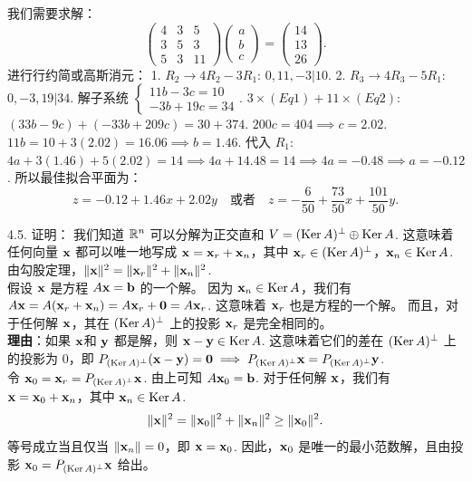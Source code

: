 \begin{exer}
我们需要求解：
$$ \begin{pmatrix} 4 & 3 & 5 \\ 3 & 5 & 3 \\ 5 & 3 & 11 \end{pmatrix} \begin{pmatrix} a \\ b \\ c \end{pmatrix} = \begin{pmatrix} 14 \\ 13 \\ 26 \end{pmatrix}. $$
进行行约简或高斯消元：
1. $R_2 \to 4R_2 - 3R_1$: $0, 11, -3 \big| 10$.
2. $R_3 \to 4R_3 - 5R_1$: $0, -3, 19 \big| 34$.
解子系统 $\begin{cases} 11b - 3c = 10 \\ -3b + 19c = 34 \end{cases}$.
$3 \times (Eq1) + 11 \times (Eq2)$: $(33b - 9c) + (-33b + 209c) = 30 + 374$.
$200c = 404 \implies c = 2.02$.
$11b = 10 + 3(2.02) = 16.06 \implies b = 1.46$.
代入 $R_1$: $4a + 3(1.46) + 5(2.02) = 14 \implies 4a + 14.48 = 14 \implies 4a = -0.48 \implies a = -0.12$.
所以最佳拟合平面为：
$$ z = -0.12 + 1.46x + 2.02y \quad \text{或者} \quad z = -\frac{6}{50} + \frac{73}{50}x + \frac{101}{50}y. $$

4.5. 证明：
我们知道 $\mathbb{R}^n$ 可以分解为正交直和 $V = (\operatorname{Ker} A)^\perp \oplus \operatorname{Ker} A$.
这意味着任何向量 $\mathbf{x}$ 都可以唯一地写成 $\mathbf{x} = \mathbf{x}_r + \mathbf{x}_n$，其中 $\mathbf{x}_r \in (\operatorname{Ker} A)^\perp$，$\mathbf{x}_n \in \operatorname{Ker} A$.
由勾股定理，$\|\mathbf{x}\|^2 = \|\mathbf{x}_r\|^2 + \|\mathbf{x}_n\|^2$.
\\
假设 $\mathbf{x}$ 是方程 $A\mathbf{x} = \mathbf{b}$ 的一个解。
因为 $\mathbf{x}_n \in \operatorname{Ker} A$，我们有 $A\mathbf{x} = A(\mathbf{x}_r + \mathbf{x}_n) = A\mathbf{x}_r + \mathbf{0} = A\mathbf{x}_r$.
这意味着 $\mathbf{x}_r$ 也是方程的一个解。
而且，对于任何解 $\mathbf{x}$，其在 $(\operatorname{Ker} A)^\perp$ 上的投影 $\mathbf{x}_r$ 是完全相同的。\\
\textbf{理由}：如果 $\mathbf{x}$和 $\mathbf{y}$ 都是解，则 $\mathbf{x} - \mathbf{y} \in \operatorname{Ker} A$. 这意味着它们的差在 $(\operatorname{Ker} A)^\perp$ 上的投影为 0，即 $P_{(\operatorname{Ker} A)^\perp} (\mathbf{x} - \mathbf{y}) = \mathbf{0} \implies P_{(\operatorname{Ker} A)^\perp} \mathbf{x} = P_{(\operatorname{Ker} A)^\perp} \mathbf{y}$.
\\
令 $\mathbf{x}_0 = \mathbf{x}_r = P_{(\operatorname{Ker} A)^\perp} \mathbf{x}$.
由上可知 $A\mathbf{x}_0 = \mathbf{b}$.
对于任何解 $\mathbf{x}$，我们有 $\mathbf{x} = \mathbf{x}_0 + \mathbf{x}_n$，其中 $\mathbf{x}_n \in \operatorname{Ker} A$.
$$ \|\mathbf{x}\|^2 = \|\mathbf{x}_0\|^2 + \|\mathbf{x}_n\|^2 \ge \|\mathbf{x}_0\|^2. $$
等号成立当且仅当 $\|\mathbf{x}_n\| = 0$，即 $\mathbf{x} = \mathbf{x}_0$.
因此，$\mathbf{x}_0$ 是唯一的最小范数解，且由投影 $\mathbf{x}_0 = P_{(\operatorname{Ker} A)^\perp} \mathbf{x}$ 给出。


\end{exer}
